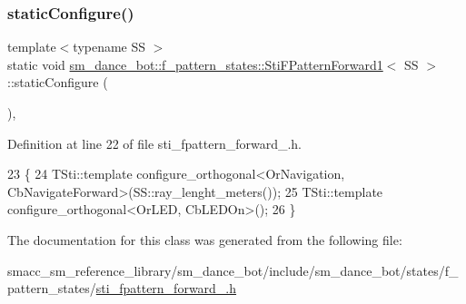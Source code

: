\subsubsection{\texorpdfstring{static\+Configure()}{staticConfigure()}}
{\footnotesize\ttfamily template$<$typename SS $>$ \\
static void \hyperlink{structsm__dance__bot_1_1f__pattern__states_1_1StiFPatternForward1}{sm\+\_\+dance\+\_\+bot\+::f\+\_\+pattern\+\_\+states\+::\+Sti\+F\+Pattern\+Forward1}$<$ SS $>$\+::static\+Configure (\begin{DoxyParamCaption}{ }\end{DoxyParamCaption})\hspace{0.3cm}{\ttfamily [inline]}, {\ttfamily [static]}}



Definition at line 22 of file sti\+\_\+fpattern\+\_\+forward\+\_.\+h.


\begin{DoxyCode}
23   \{
24      TSti::template configure\_orthogonal<OrNavigation, CbNavigateForward>(SS::ray\_lenght\_meters());
25      TSti::template configure\_orthogonal<OrLED, CbLEDOn>();
26   \}
\end{DoxyCode}


The documentation for this class was generated from the following file\+:\begin{DoxyCompactItemize}
\item 
smacc\+\_\+sm\+\_\+reference\+\_\+library/sm\+\_\+dance\+\_\+bot/include/sm\+\_\+dance\+\_\+bot/states/f\+\_\+pattern\+\_\+states/\hyperlink{include_2sm__dance__bot_2states_2f__pattern__states_2sti__fpattern__forward__1_8h}{sti\+\_\+fpattern\+\_\+forward\+\_.\+h}\end{DoxyCompactItemize}
